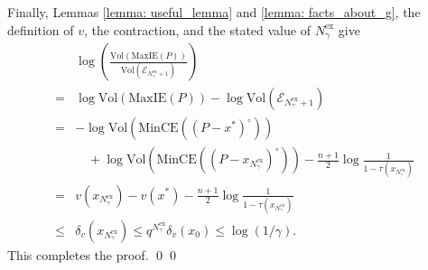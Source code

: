 \documentclass[smallextended]{svjour3}
\let\springerproof\proof
\let\endspringerproof\endproof
\renewenvironment{proof}{\springerproof}{%
  \ifhmode\qed\else\leavevmode\qed\fi\endspringerproof}
\newcommand{\V}{{\mathrm{Vol}}}
\newcommand{\E}{\mathcal{E}}
\newcommand{\MaxIE}{\mathrm{MaxIE}}
\begin{document}
\begin{proof}
    Finally, Lemmas \ref{lemma: useful_lemma} and
    \ref{lemma: facts_about_g}, the definition of $v$, the contraction,
    and the stated value of $N_\gamma^{\mathrm{ex}}$ give
    \begin{align*}
        & \log \left(\frac{\V(\MaxIE(P))}
        {\V(\E_{N_\gamma^{\mathrm{ex}}+1})}\right) \\
        = & \log \V(\MaxIE(P))
        - \log \V(\E_{N_\gamma^{\mathrm{ex}}+1}) \\
        = & -\log \V(\mathrm{MinCE}((P-x^*)^\circ)) \\
        &\quad + \log \V(\mathrm{MinCE}((P-x_{N_\gamma^{\mathrm{ex}}})^\circ))
        - \frac{n+1}{2}\log \frac{1}{1-\tau(x_{N_\gamma^{\mathrm{ex}}})}\\
        =  & v(x_{N_\gamma^{\mathrm{ex}}}) - v(x^*)
        - \frac{n+1}{2}\log \frac{1}{1-\tau(x_{N_\gamma^{\mathrm{ex}}})} \\
        \leq & \delta_v(x_{N_\gamma^{\mathrm{ex}}})
        \leq q^{N_\gamma^{\mathrm{ex}}}\delta_v(x_0)
        \leq \log (1/\gamma).
    \end{align*}
    This completes the proof. 
\end{proof}
\end{document}
